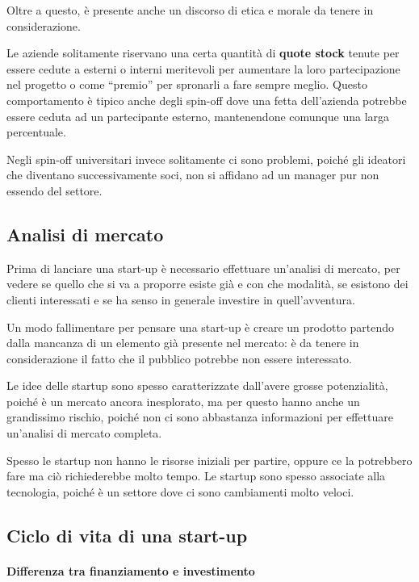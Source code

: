 

Oltre a questo, è presente anche un discorso di etica e morale da tenere in
considerazione.

Le aziende solitamente riservano una certa quantità di \textbf{quote stock}
tenute per essere cedute a esterni o interni meritevoli per aumentare la loro
partecipazione nel progetto o come ``premio'' per spronarli a fare sempre
meglio. Questo comportamento è tipico anche degli spin-off dove una fetta
dell'azienda potrebbe essere ceduta ad un partecipante esterno, mantenendone
comunque una larga percentuale.

Negli spin-off universitari invece solitamente ci sono problemi, poiché gli
ideatori che diventano successivamente soci, non si affidano ad un manager pur
non essendo del settore.

\subsection{Analisi di mercato}

Prima di lanciare una start-up è necessario effettuare un'analisi di mercato,
per vedere se quello che si va a proporre esiste già e con che modalità, se
esistono dei clienti interessati e se ha senso in generale investire in
quell'avventura.

Un modo fallimentare per pensare una start-up è creare un prodotto partendo
dalla mancanza di un elemento già presente nel mercato: è da tenere in
considerazione il fatto che il pubblico potrebbe non essere interessato.

Le idee delle startup sono spesso caratterizzate dall'avere grosse
potenzialità, poiché è un mercato ancora inesplorato, ma per questo hanno anche
un grandissimo rischio, poiché non ci sono abbastanza informazioni per
effettuare un'analisi di mercato completa.

Spesso le startup non hanno le risorse iniziali per
partire, oppure ce la potrebbero fare ma ciò richiederebbe molto tempo. Le
startup sono spesso associate alla tecnologia, poiché è un settore dove ci sono
cambiamenti molto veloci.

\subsection{Ciclo di vita di una start-up}

\paragraph*{Differenza tra finanziamento e investimento} 

